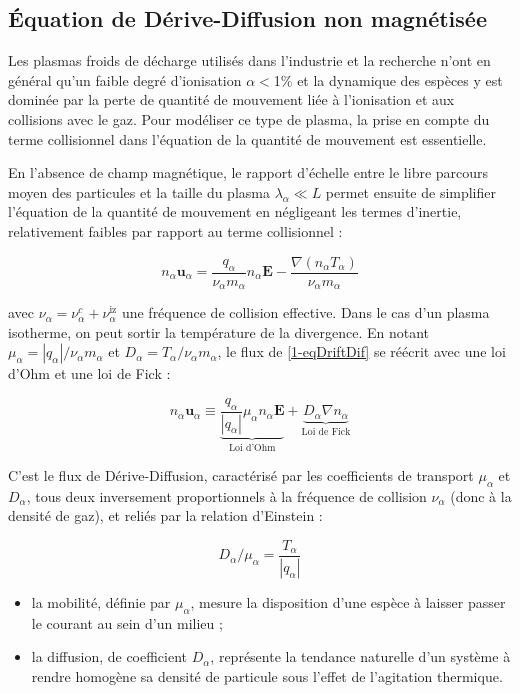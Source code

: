 \begin{refsection}
\subsection{Équation de Dérive-Diffusion non magnétisée}
Les plasmas froids de décharge utilisés dans l'industrie et la recherche n'ont
en général qu'un faible degré d'ionisation $\alpha<$1\% et la dynamique des
espèces y est dominée par la perte de quantité de mouvement liée à l'ionisation
et aux collisions avec le gaz. Pour modéliser ce type de plasma, la prise en
compte du terme collisionnel dans l'équation de la quantité de mouvement est
essentielle. 


En l'absence de champ magnétique, le rapport d'échelle entre le libre parcours moyen des particules
et la taille du plasma $\lambda_\alpha\ll L$ permet ensuite de simplifier
l'équation de la quantité de mouvement en négligeant les termes d'inertie, relativement
faibles par rapport au terme collisionnel :

\begin{equation}
\label{1-eqDriftDif}
n_\alpha\mathbf u_\alpha=\frac{q_\alpha}{\nu_\alpha m_\alpha}n_\alpha\mathbf
E-\frac{\nabla\left(n_\alpha T_\alpha\right)}{\nu_\alpha
m_\alpha}
\end{equation}

avec $\nu_\alpha=\nu_\alpha^c+\nu_\alpha^\text{iz}$ une fréquence de collision
effective. Dans le cas d'un plasma isotherme, on peut sortir la température de
la divergence.
En notant $\mu_\alpha=|q_\alpha|/\nu_\alpha m_\alpha$ et
$D_\alpha=T_\alpha/\nu_\alpha m_\alpha$, le flux de \eqref{1-eqDriftDif} se
réécrit avec une loi d'Ohm et une loi de Fick :

\begin{equation}
\label{1-eqDriftDif2}
n_\alpha\mathbf u_\alpha\equiv\underbrace{\frac{q_\alpha}{|q_\alpha|}\mu_\alpha n_\alpha\mathbf E}_\text{Loi d'Ohm}+\underbrace{D_\alpha{\nabla n_\alpha}}_\text{Loi
de Fick}
\end{equation}

 C'est le flux de Dérive-Diffusion, caractérisé par les coefficients de
transport $\mu_\alpha$ et
$D_\alpha$, tous deux inversement proportionnels à la fréquence de collision
$\nu_\alpha$ (donc à la densité de gaz), et reliés par la relation d'Einstein :

\begin{equation}
\label{1-EinsteinRelation}
D_\alpha/\mu_\alpha=\frac{T_\alpha}{|q_\alpha|}
\end{equation}

\begin{itemize}
  \item la mobilité, définie par $\mu_\alpha$,
  mesure la disposition d'une espèce à laisser passer le courant au sein d'un
  milieu ; 
  \item la diffusion, de coefficient $D_\alpha$,
  représente la tendance naturelle d'un système à rendre homogène sa densité de particule sous l'effet
  de l'agitation thermique.
\end{itemize}


\end{refsection}
